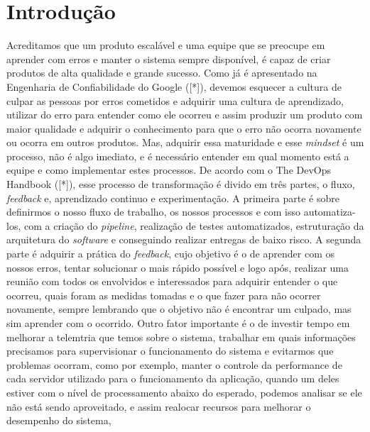\chapter{Introdução}

  Acreditamos que um produto escalável e uma equipe que se preocupe em aprender
  com erros e manter o sistema sempre disponível, é capaz de criar produtos de
  alta qualidade e grande sucesso. \newline
  Como já é apresentado na Engenharia de Confiabilidade do Google ([*]), devemos
  esquecer a cultura de culpar as pessoas por erros cometidos e adquirir uma
  cultura de aprendizado, utilizar do erro para entender como ele ocorreu e assim
  produzir um produto com maior qualidade e adquirir o conhecimento para que o
  erro não ocorra novamente ou ocorra em outros produtos. Mas, adquirir essa
  maturidade e esse \textit{mindset} é um processo, não é algo imediato, e é
  necessário entender em qual momento está a equipe e como implementar estes
  processos. \newline
  De acordo com o The DevOps Handbook ([*]), esse processo de transformação é
  divido em três partes, o fluxo, \textit{feedback} e, aprendizado continuo e
  experimentação. A primeira parte é sobre definirmos o nosso fluxo de trabalho,
  os nossos processos e com isso automatiza-los, com a criação do \textit{pipeline},
  realização de testes automatizados, estruturação da arquitetura do \textit{software}
  e conseguindo realizar entregas de baixo risco. A segunda parte é adquirir a
  prática do \textit{feedback}, cujo objetivo é o de aprender com os nossos erros,
  tentar solucionar o mais rápido possível e logo após, realizar uma reunião com
  todos os envolvidos e interessados para adquirir entender o que ocorreu, quais
  foram as medidas tomadas e o que fazer para não ocorrer novamente, sempre
  lembrando que o objetivo não é encontrar um culpado, mas sim aprender com o
  ocorrido. Outro fator importante é o de investir tempo em melhorar a telemtria
  que temos sobre o sistema, trabalhar em quais informações precisamos para
  supervisionar o funcionamento do sistema e evitarmos que problemas ocorram,
  como por exemplo, manter o controle da performance de cada servidor utilizado
  para o funcionamento da aplicação, quando um deles estiver com o nível de
  processamento abaixo do esperado, podemos analisar se ele não está sendo
  aproveitado, e assim realocar recursos para melhorar o desempenho do sistema,

